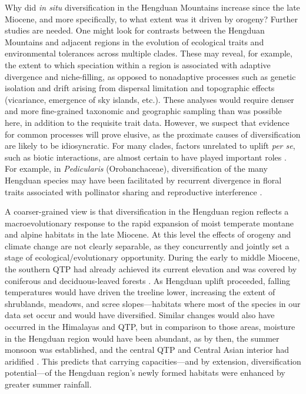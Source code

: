 Why did \textit{in situ} diversification in the Hengduan Mountains
increase since the late Miocene, and more specifically, to what extent
was it driven by orogeny? Further studies are needed. One might look
for contrasts between the Hengduan Mountains and adjacent regions in
the evolution of ecological traits and environmental tolerances
\citep[e.g.,][]{liu2016} across multiple clades. These may reveal, for
example, the extent to which speciation within a region is associated
with adaptive divergence and niche-filling, as opposed to nonadaptive
processes such as genetic isolation and drift arising from dispersal
limitation and topographic effects (vicariance, emergence of sky
islands, etc.). These analyses would require denser and more
fine-grained taxonomic and geographic sampling than was possible here,
in addition to the requisite trait data. However, we suspect that
evidence for common processes will prove elusive, as the proximate
causes of diversification are likely to be idiosyncratic. For many
clades, factors unrelated to uplift \emph{per se}, such as biotic
interactions, are almost certain to have played important roles
\citep{Luebert2014,Wen2014,Renner2016}. For example, in
\emph{Pedicularis} (Orobanchaceae), diversification of the many
Hengduan species may have been facilitated by recurrent divergence in
floral traits associated with pollinator sharing and reproductive
interference \citep[e.g.,][]{eaton2012}.


A coarser-grained view is that diversification in the Hengduan region
reflects a macroevolutionary response to the rapid expansion of moist
temperate montane and alpine habitats in the late Miocene. At this
level the effects of orogeny and climate change are not clearly
separable, as they concurrently and jointly set a stage of
ecological/evolutionary opportunity. During the early to middle
Miocene, the southern QTP had already achieved its current elevation
\citep{Spicer2003} and was covered by coniferous and deciduous-leaved
forests
\citep{SunJ2014,LiH1976}%
. As Hengduan uplift proceeded, falling temperatures would have driven
the treeline lower, increasing the extent of shrublands, meadows, and
scree slopes---habitats where most of the species in our data set
occur and would have diversified. Similar changes would also have
occurred in the Himalayas and QTP, but in comparison to those areas,
moisture in the Hengduan region would have been abundant, as by then,
the summer monsoon was established, and the central QTP and Central
Asian interior had aridified \citep[see][]{Renner2016}. This predicts
that carrying capacities---and by extension, diversification
potential---of the Hengduan region's newly formed habitats were
enhanced by greater summer rainfall.

